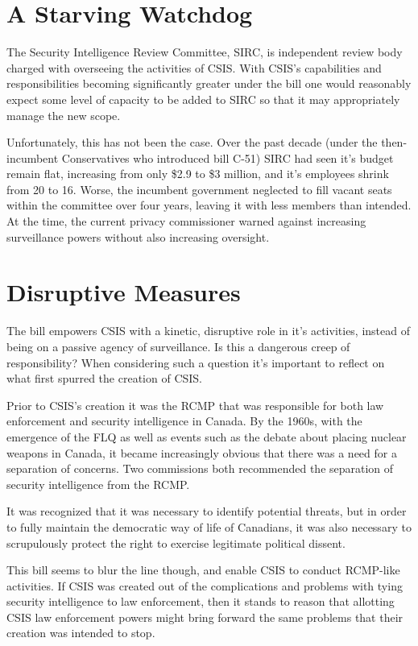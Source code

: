 \documentclass[a4paper, 11pt]{article} %
\begin{document}
\section*{A Starving Watchdog}
The Security Intelligence Review Committee, SIRC, is independent review body charged with overseeing the activities of CSIS. With CSIS's capabilities and responsibilities becoming significantly greater under the bill one would reasonably expect some level of capacity to be added to SIRC so that it may appropriately manage the new scope.

Unfortunately, this has not been the case. Over the past decade (under the then-incumbent Conservatives who introduced bill C-51) SIRC had seen it's budget remain flat, increasing from only \$2.9 to \$3 million, and it's employees shrink from 20 to 16. Worse, the incumbent government neglected to fill vacant seats within the committee over four years, leaving it with less members than intended. At the time, the current privacy commissioner warned against increasing surveillance powers without also increasing oversight. \cite{watchdog-starved}

\section*{Disruptive Measures}
The bill empowers CSIS with a kinetic, disruptive role in it's activities, instead of being on a passive agency of surveillance. Is this a dangerous creep of responsibility? When considering such a question it's important to reflect on what first spurred the creation of CSIS.

Prior to CSIS's creation it was the RCMP that was responsible for both law enforcement and security intelligence in Canada. By the 1960s, with the emergence of the FLQ as well as events such as the debate about placing nuclear weapons in Canada, it became increasingly obvious that there was a need for a separation of concerns. Two commissions both recommended the separation of security intelligence from the RCMP.

It was recognized that it was necessary to identify potential threats, but in order to fully maintain the democratic way of life of Canadians, it was also necessary to scrupulously protect the right to exercise legitimate political dissent. \cite{history-of-csis}

This bill seems to blur the line though, and enable CSIS to conduct RCMP-like activities. If CSIS was created out of the complications and problems with tying security intelligence to law enforcement, then it stands to reason that allotting CSIS law enforcement powers might bring forward the same problems that their creation was intended to stop.
\end{document}
